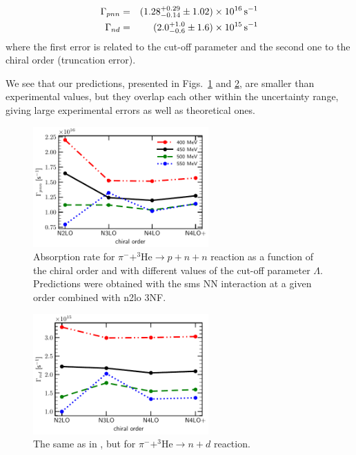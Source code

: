     \begin{eqnarray}\label{Gam_nd_our}
        \Gamma_{pnn}  & =& (1.28^{+ 0.29}_{-0.14} \pm 1.02)\times 10^{16} \, {\rm s^{-1}}\\ \label{Gam_nd_pnn_our}
        \Gamma_{nd} & =  & (2.0^{+1.0}_{-0.6}\pm 1.6)\times 10^{15} \, {\rm s^{-1}}\\ \label{Gam_pnn_our}
    \end{eqnarray}
    where the first error is related to the cut-off parameter and the second one to the chiral order (truncation error).

    We see that our predictions, presented in Figs.~\ref{Gamma_pnn} and \ref{Gamma_nd}, are 
    smaller than experimental values, but they overlap each other within the uncertainty range, giving large experimental errors as well as theoretical ones.



    \begin{figure}[h]
        \begin{center}
        \includegraphics[width=0.6\textwidth]{PlotData/PION/Dalitz_maps/figures/Gamma_pnn.pdf}
        \end{center}
        \caption{Absorption rate for $\pi^- + ^3\text{He} \rightarrow p + n + n$ reaction as a function
        of the chiral order and with different values of the cut-off parameter $\Lambda$.
        Predictions were obtained with the \gls{sms} NN interaction at a given order combined
        with \gls{n2lo} 3NF.}
        \label{Gamma_pnn}
    \end{figure}

    \begin{figure}[h]
        \begin{center}
        \includegraphics[width=0.6\textwidth]{PlotData/PION/Dalitz_maps/figures/Gamma_nd.pdf}
        \end{center}
        \caption{The same as in , but for $\pi^- + ^3\text{He} \rightarrow n + d$ reaction.}
        \label{Gamma_nd}
    \end{figure}

